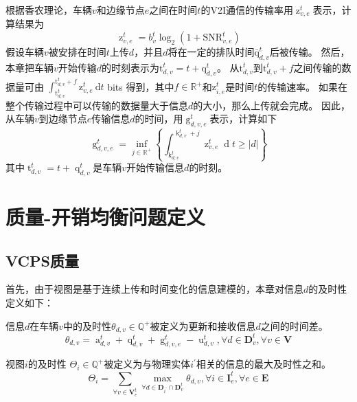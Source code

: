 根据香农理论，车辆$v$和边缘节点$e$之间在时间$t$的V2I通信的传输率用$\operatorname{z}_{v, e}^t$表示，计算结果为
\begin{equation}
    \operatorname{z}_{v, e}^t=b_{v}^{t} \log _{2}\left(1+\mathrm{SNR}_{v, e}^{t}\right)
\end{equation}
假设车辆$v$被安排在时间$t$上传$d$，并且$d$将在一定的排队时间$\mathrm{\bar{q}}_{d, v}^t$后被传输。
然后，本章把车辆$v$开始传输$d$的时刻表示为$\mathrm{t}_{d, v}^t=t+\mathrm{q}_{d, v}^t$。
从$\mathrm{t}_{d, v}^t$到$\mathrm{t}_{d, v}^t + f$之间传输的数据量可由 $\int_{\mathrm{t}_{d, v}^t}^{\mathrm{t}_{d, v}^t+f} \mathrm{z}_{v, e}^t \mathrm{~d} t$ bits 得到，其中$f \in \mathbb{R}^{+}$和$\mathrm{z}_{i, e}^t$是时间$t$的传输速率。
如果在整个传输过程中可以传输的数据量大于信息$d$的大小，那么上传就会完成。
因此，从车辆$v$到边缘节点$e$传输信息$d$的时间，用$\operatorname{g}_{d, v, e}^t$表示，计算如下 
\begin{equation}
    \operatorname{g}_{d, v, e}^t=\inf _{j \in \mathbb{R}^+} \left \{ \int_{\operatorname{k}_{d, v}^t}^{\operatorname{k}_{d, v}^t + j} {\operatorname{z}_{v, e}^t} \operatorname{d}t \geq \left|d\right| \right \} 
\end{equation}
\noindent 其中$\operatorname{t}_{d, v}^t = t +\operatorname{q}_{d, v}^t$是车辆$v$开始传输信息$d$的时刻。

\section{质量-开销均衡问题定义}\label{section 4-4}

\subsection{VCPS质量}
首先，由于视图是基于连续上传和时间变化的信息建模的，本章对信息$d$的及时性定义如下：
\begin{definition}
信息$d$在车辆$v$中的及时性$\theta_{d, v} \in \mathbb{Q}^{+}$被定义为更新和接收信息$d$之间的时间差。
\begin{equation}
    \theta_{d, v} = \operatorname{a}_{d, v}^t + \operatorname{q}_{d, v}^t + \operatorname{g}_{d, v, e}^t-\operatorname{u}_{d, v}^{t}, \forall d \in \mathbf{D}_v^t,\forall v \in \mathbf{V}
\end{equation}
\end{definition}
\begin{definition}
视图$i$的及时性 $\Theta_{i} \in \mathbb{Q}^{+}$被定义为与物理实体$i^{\prime}$相关的信息的最大及时性之和。
	\begin{equation}
    	\Theta_{i} = \sum_{\forall v\in \mathbf{V}_{e}^{t}} \max_{\forall d \in \mathbf{D}_{i^{\prime}} \cap \mathbf{D}_v^t}\theta_{d, v}, \forall i \in \mathbf{I}_{e}^{t}, \forall e \in \mathbf{E}
    	\label{equ 4-16}
	\end{equation}
\end{definition}

